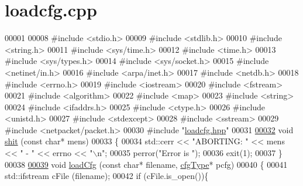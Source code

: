 \hypertarget{loadcfg_8cpp_source}{}\section{loadcfg.\+cpp}
\label{loadcfg_8cpp_source}

\begin{DoxyCode}
00001 
00008 \textcolor{preprocessor}{#include <stdio.h>}
00009 \textcolor{preprocessor}{#include <stdlib.h>}
00010 \textcolor{preprocessor}{#include <string.h>}
00011 \textcolor{preprocessor}{#include <sys/time.h>}
00012 \textcolor{preprocessor}{#include <time.h>}
00013 \textcolor{preprocessor}{#include <sys/types.h>}
00014 \textcolor{preprocessor}{#include <sys/socket.h>}
00015 \textcolor{preprocessor}{#include <netinet/in.h>}
00016 \textcolor{preprocessor}{#include <arpa/inet.h>}
00017 \textcolor{preprocessor}{#include <netdb.h>}
00018 \textcolor{preprocessor}{#include <errno.h>}
00019 \textcolor{preprocessor}{#include <iostream>}
00020 \textcolor{preprocessor}{#include <fstream>}
00021 \textcolor{preprocessor}{#include <algorithm>}
00022 \textcolor{preprocessor}{#include <map>}
00023 \textcolor{preprocessor}{#include <string>}
00024 \textcolor{preprocessor}{#include <ifaddrs.h>}
00025 \textcolor{preprocessor}{#include <ctype.h>}
00026 \textcolor{preprocessor}{#include <unistd.h>}
00027 \textcolor{preprocessor}{#include <stdexcept>}
00028 \textcolor{preprocessor}{#include <sstream>}
00029 \textcolor{preprocessor}{#include <netpacket/packet.h>}
00030 \textcolor{preprocessor}{#include "\hyperlink{loadcfg_8hpp}{loadcfg.hpp}"}
00031 
\hyperlink{loadcfg_8hpp_a91f772c379dc1d6c6088d077aa722574}{00032} \textcolor{keywordtype}{void} \hyperlink{loadcfg_8cpp_a91f772c379dc1d6c6088d077aa722574}{shit} (\textcolor{keyword}{const} \textcolor{keywordtype}{char}* mens)
00033 \{
00034 std::cerr << \textcolor{stringliteral}{"ABORTING: "} << mens << \textcolor{stringliteral}{" - "} << errno << \textcolor{stringliteral}{"\(\backslash\)n"};
00035 perror(\textcolor{stringliteral}{"Error is "});
00036 exit(1);
00037 \}
00038 
\hyperlink{loadcfg_8hpp_a4667fdb45ba6b04ab678f894e58a2fcb}{00039} \textcolor{keywordtype}{void} \hyperlink{loadcfg_8cpp_a4667fdb45ba6b04ab678f894e58a2fcb}{loadCfg} (\textcolor{keyword}{const} \textcolor{keywordtype}{char}* filename, \hyperlink{loadcfg_8hpp_a3bc0e674227412446fc364a733cebde6}{cfgType}* pcfg)
00040 \{
00041    std::ifstream cFile (filename);
00042    \textcolor{keywordflow}{if} (cFile.is\_open())\{

\end{DoxyCode}
